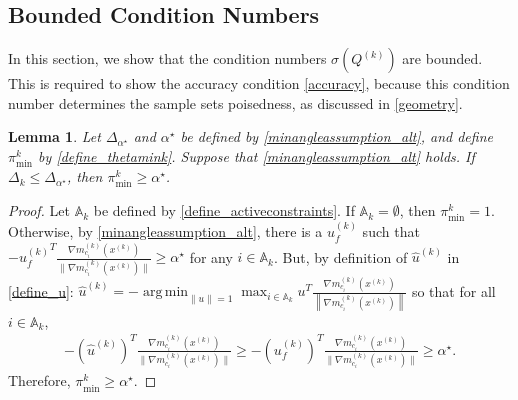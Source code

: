 \documentclass{article}
\newtheorem{lemma}[theorem]{Lemma}
\theoremstyle{case}
\numberwithin{theorem}{subsection}
\DeclareMathOperator*{\argmin}{arg\,min}
\newcommand{\activeconstraintsk}{{\mathbb A_{k}}}
\newcommand{\dk}{\Delta_k}
\newcommand{\gmcik}{{\nabla m_{c_i}^{(k)}\left(\xk\right)}}
\newcommand{\huk}{{{\hat u}^{(k)}}}
\newcommand{\minanglealpha}{{ \alpha^{\star} }}
\newcommand{\minangledelta}{{\Delta_{\alpha^{\star}}}}
\newcommand{\qk}{{Q^{(k)}}}
\newcommand{\thetamink}{{\pi^k_{\textrm{min}}}}
\newcommand{\xk}{x^{(k)}}
\newcommand{\minangledirk}{{u^{(k)}_f}}
\begin{document}
\subsection{Bounded Condition Numbers}
\label{bounded_condition_numbers}
In this section, we show that the condition numbers $\sigma(\qk)$ are bounded.
This is required to show the accuracy condition \cref{accuracy}, because this condition number determines the sample sets poisedness, as discussed in \cref{geometry}.

\begin{lemma}
\label{theta_min_is_bounded}
Let $\minangledelta$ and $\minanglealpha$ be defined by \cref{minangleassumption_alt}, and
define $\thetamink$ by \cref{define_thetamink}.
Suppose that \cref{minangleassumption_alt} holds.
If $\dk \le \minangledelta$, then $\thetamink \ge \minanglealpha$.
\end{lemma}

\begin{proof}
Let $\activeconstraintsk$ be defined by \cref{define_activeconstraints}.
If $\activeconstraintsk = \emptyset$, then $\thetamink = 1$.
Otherwise, by \cref{minangleassumption_alt}, there is a $\minangledirk$ such that 
$-\minangledirk^T\frac{\gmcik}{\|\gmcik\|} \ge \minanglealpha$ for any $i \in \activeconstraintsk$.
But, by definition of $\huk$ in \cref{define_u}:
$\huk = -\argmin_{\|u\| = 1} \max_{i \in \activeconstraintsk} u^T\frac{\gmcik}{\left\|\gmcik\right\|}$
so that for all $i \in \activeconstraintsk$,
\begin{align*}
-\left(\huk\right)^T\frac{\gmcik}{\|\gmcik\|}  \ge -\left(\minangledirk\right)^T\frac{\gmcik}{\|\gmcik\|} \ge \minanglealpha.
\end{align*}
Therefore, $\thetamink \ge \minanglealpha$.
\end{proof}
\end{document}
